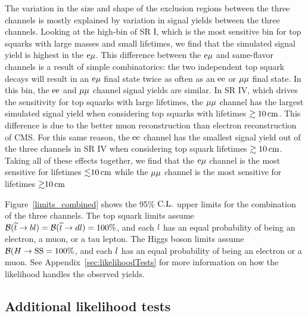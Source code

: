The variation in the size and shape of the exclusion regions between the three channels is mostly explained by variation in signal yields between the three channels. Looking at the high-\pt bin of SR I, which is the most sensitive bin for top squarks with large masses and small lifetimes, we find that the simulated signal yield is highest in the $\mathrm{e}{\mu}$. This difference between the $\mathrm{e}{\mu}$ and same-flavor channels is a result of simple combinatorics: the two independent top squark decays will result in an $\mathrm{e}{\mu}$ final state twice as often as an $\mathrm{e}\mathrm{e}$ or ${\mu}{\mu}$ final state. In this bin, the $\mathrm{e}\mathrm{e}$ and ${\mu}{\mu}$ channel signal yields are similar. In SR IV, which drives the sensitivity for top squarks with large lifetimes, the ${\mu}{\mu}$ channel has the largest simulated signal yield when considering top squarks with lifetimes $\gtrsim10\,\text{cm}$. This difference is due to the better muon reconstruction than electron reconstruction of CMS. For this same reason, the $\mathrm{e}\mathrm{e}$ channel has the smallest signal yield out of the three channels in SR IV when considering top squark lifetimes $\gtrsim10\,\text{cm}$. Taking all of these effects together, we find that the $\mathrm{e}{\mu}$ channel is the most sensitive for lifetimes ${\lesssim}10\,\text{cm}$ while the ${\mu}{\mu}$ channel is the most sensitive for lifetimes ${\gtrsim}10\,\text{cm}$

Figure~\ref{limits_combined} shows the 95\% $\text{C.L.}$ upper limits for the combination of the three channels. The top squark limits assume $\mathcal{B}(\widetilde{t} \to b l)=\mathcal{B}(\widetilde{t} \to d l)=100\%$, and each $l$ has an equal probability of being an electron, a muon, or a tau lepton. The Higgs boson limits assume $\mathcal{B}(H \to \mathrm{S}\mathrm{S}=100\%$, and each $l$ has an equal probability of being an electron or a muon. See Appendix~\ref{sec:likelihoodTests} for more information on how the likelihood handles the observed yields.



\subsection{Additional likelihood tests}


\pagebreak